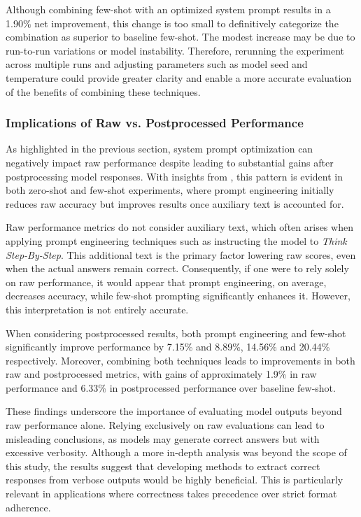 Although combining few-shot with an optimized system prompt results in a 1.90\% net improvement, this change is too small to definitively categorize the combination as superior to baseline few-shot. The modest increase may be due to run-to-run variations or model instability. Therefore, rerunning the experiment across multiple runs and adjusting parameters such as model seed and temperature could provide greater clarity and enable a more accurate evaluation of the benefits of combining these techniques.

\subsubsection{Implications of Raw vs. Postprocessed Performance}
\label{par:raw-vs-post-performance}

As highlighted in the previous section, system prompt optimization can negatively impact raw performance despite leading to substantial gains after postprocessing model responses. With insights from , this pattern is evident in both zero-shot and few-shot experiments, where prompt engineering initially reduces raw accuracy but improves results once auxiliary text is accounted for.

Raw performance metrics do not consider auxiliary text, which often arises when applying prompt engineering techniques such as instructing the model to \textit{Think Step-By-Step}. This additional text is the primary factor lowering raw scores, even when the actual answers remain correct. Consequently, if one were to rely solely on raw performance, it would appear that prompt engineering, on average, decreases accuracy, while few-shot prompting significantly enhances it. However, this interpretation is not entirely accurate.

When considering postprocessed results, both prompt engineering and few-shot significantly improve performance by 7.15\% and 8.89\%, 14.56\% and 20.44\% respectively. Moreover, combining both techniques leads to improvements in both raw and postprocessed metrics, with gains of approximately 1.9\% in raw performance and 6.33\% in postprocessed performance over baseline few-shot.

These findings underscore the importance of evaluating model outputs beyond raw performance alone. Relying exclusively on raw evaluations can lead to misleading conclusions, as models may generate correct answers but with excessive verbosity. Although a more in-depth analysis was beyond the scope of this study, the results suggest that developing methods to extract correct responses from verbose outputs would be highly beneficial. This is particularly relevant in applications where correctness takes precedence over strict format adherence.

\subsubsection{}